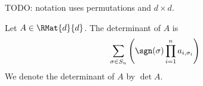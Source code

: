 



TODO: notation uses permutations
and $d \times d$.

Let $A \in \RMat{d}{d}$.
The determinant of $A$ is
\[
  \sum_{\sigma \in S_n} \left( \sgn(\sigma) \prod_{i = 1}^{n} a_{i,\sigma_{i}} \right)
\]
We denote the determinant of $A$ by $\det A$.


